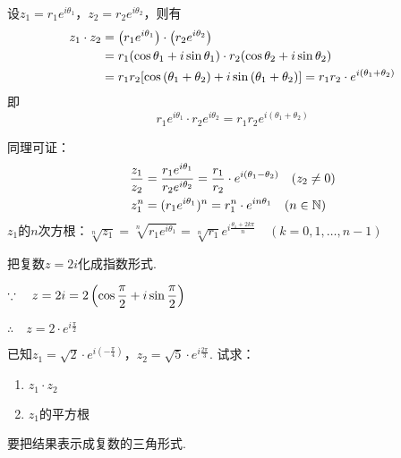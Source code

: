 设$z_1=r_1e^{i\theta_1}$，$z_2=r_2e^{i\theta_2}$，则有
\[\begin{split}
    z_1\cdot z_2&=\left(r_1e^{i\theta_1}\right)\cdot \left(r_2e^{i\theta_2}\right)\\
    &=r_1(\cos{\theta_1}+i\sin{\theta_1})\cdot r_2(\cos{\theta_2}+i\sin{\theta_2})\\
    &=r_1r_2[\cos\left(\theta_1+\theta_2\right)+i\sin\left(\theta_1+\theta_2\right)]=r_1r_2\cdot e^{i(\theta_1+\theta_2)}
\end{split}\]
即
\[r_1e^{i\theta_1}\cdot r_2e^{i\theta_2}=r_1r_2 e^{i(\theta_1+\theta_2)}\]

同理可证：
\[\begin{split}
    \dfrac{z_1}{z_2}&=\dfrac{r_1e^{i\theta_1}}{r_2e^{i\theta_2}}=\dfrac{r_1}{r_2}\cdot e^{i(\theta_1-\theta_2)}\quad (z_2\ne 0)\\
z^n_1&=(r_1e^{i\theta_1})^n=r^n_1 \cdot e^{i n\theta_1}\quad (n\in\mathbb{N})
\end{split} \]
$z_1$的$n$次方根：$\sqrt[n]{z_1}=\sqrt[n]{r_1e^{i\theta_1}}=\sqrt[n]{r_1}e^{i\tfrac{\theta_1+2k\pi}{n}}\quad (k=0,1,\ldots,n-1)$

\begin{example}
把复数$z=2i$化成指数形式.
\end{example}

\begin{solution}
$\because\quad z=2i=2\left(\cos{\dfrac{\pi}{2}}+i\sin{\dfrac{\pi}{2}}\right)$

$\therefore\quad z=2\cdot e^{i\tfrac{\pi}{2}}$
\end{solution}

\begin{example}
已知$z_1=\sqrt{2}\cdot e^{i\left(-\tfrac{\pi}{4}\right)}$，$z_2=\sqrt{5}\cdot e^{i\tfrac{2\pi}{3}}$. 试求：
\begin{multicols}{2}
\begin{enumerate}[(1)]
    \item $z_1\cdot z_2$
    \item $z_1$的平方根
\end{enumerate}
\end{multicols}
要把结果表示成复数的三角形式.
\end{example}

